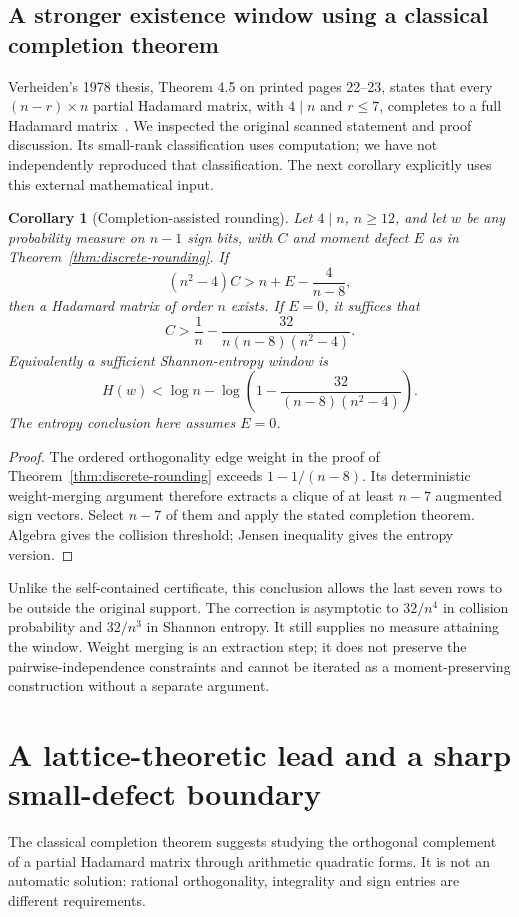 \documentclass[11pt]{article}
\newtheorem{corollary}[theorem]{Corollary}
\begin{document}
\subsection{A stronger existence window using a classical completion theorem}
Verheiden's 1978 thesis, Theorem 4.5 on printed pages 22--23,
states that every $(n-r)\times n$ partial Hadamard matrix, with
$4\mid n$ and $r\le7$, completes to a full Hadamard
matrix~\cite{Verheiden}. We inspected the original scanned statement
and proof discussion. Its small-rank classification uses computation;
we have not independently reproduced that classification. The next
corollary explicitly uses this external mathematical input.

\begin{corollary}[Completion-assisted rounding]\label{cor:completion-rounding}
Let $4\mid n$, $n\ge12$, and let $w$ be any probability measure on
$n-1$ sign bits, with $C$ and moment defect $E$ as in
Theorem~\ref{thm:discrete-rounding}. If
\[
 (n^2-4)C>n+E-\frac4{n-8},
\]
then a Hadamard matrix of order $n$ exists. If $E=0$, it suffices that
\[
 C>\frac1n-\frac{32}{n(n-8)(n^2-4)}.
\]
Equivalently a sufficient Shannon-entropy window is
\[
 H(w)<\log n-\log\left(1-\frac{32}{(n-8)(n^2-4)}\right).
\]
The entropy conclusion here assumes $E=0$.
\end{corollary}
\begin{proof}
The ordered orthogonality edge weight in the proof of
Theorem~\ref{thm:discrete-rounding} exceeds $1-1/(n-8)$.
Its deterministic weight-merging argument therefore extracts a clique
of at least $n-7$ augmented sign vectors. Select $n-7$ of them and
apply the stated completion theorem. Algebra gives the collision
threshold; Jensen inequality gives the entropy version.
\end{proof}
Unlike the self-contained certificate, this conclusion allows the
last seven rows to be outside the original support. The correction
is asymptotic to $32/n^4$ in collision probability and $32/n^3$ in
Shannon entropy. It still supplies no measure attaining the window.
Weight merging is an extraction step; it does not preserve the
pairwise-independence constraints and cannot be iterated as a
moment-preserving construction without a separate argument.
\section{A lattice-theoretic lead and a sharp small-defect boundary}
\label{sec:completion-lead}
The classical completion theorem suggests studying the orthogonal
complement of a partial Hadamard matrix through arithmetic quadratic
forms. It is not an automatic solution: rational orthogonality,
integrality and sign entries are different requirements.
\end{document}
